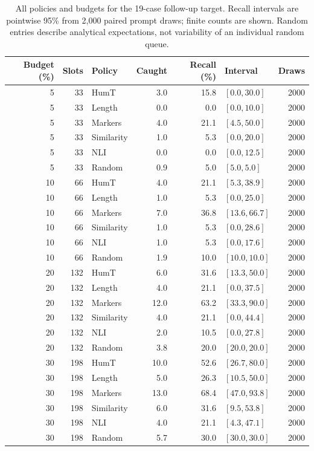 \begin{table}[p]
\centering\footnotesize
\caption{All policies and budgets for the 19-case follow-up target. Recall intervals are pointwise 95\% from 2,000 paired prompt draws; finite counts are shown. Random entries describe analytical expectations, not variability of an individual random queue.}
\label{tab:followup_budgets_all}
\begin{tabular}{rrlrrlr}
\toprule
Budget (\%) & Slots & Policy & Caught & Recall (\%) & Interval & Draws \\
\midrule
5 & 33 & HumT & 3.0 & 15.8 & $[0.0, 30.0]$ & 2000 \\
5 & 33 & Length & 0.0 & 0.0 & $[0.0, 10.0]$ & 2000 \\
5 & 33 & Markers & 4.0 & 21.1 & $[4.5, 50.0]$ & 2000 \\
5 & 33 & Similarity & 1.0 & 5.3 & $[0.0, 20.0]$ & 2000 \\
5 & 33 & NLI & 0.0 & 0.0 & $[0.0, 12.5]$ & 2000 \\
5 & 33 & Random & 0.9 & 5.0 & $[5.0, 5.0]$ & 2000 \\
10 & 66 & HumT & 4.0 & 21.1 & $[5.3, 38.9]$ & 2000 \\
10 & 66 & Length & 1.0 & 5.3 & $[0.0, 25.0]$ & 2000 \\
10 & 66 & Markers & 7.0 & 36.8 & $[13.6, 66.7]$ & 2000 \\
10 & 66 & Similarity & 1.0 & 5.3 & $[0.0, 28.6]$ & 2000 \\
10 & 66 & NLI & 1.0 & 5.3 & $[0.0, 17.6]$ & 2000 \\
10 & 66 & Random & 1.9 & 10.0 & $[10.0, 10.0]$ & 2000 \\
20 & 132 & HumT & 6.0 & 31.6 & $[13.3, 50.0]$ & 2000 \\
20 & 132 & Length & 4.0 & 21.1 & $[0.0, 37.5]$ & 2000 \\
20 & 132 & Markers & 12.0 & 63.2 & $[33.3, 90.0]$ & 2000 \\
20 & 132 & Similarity & 4.0 & 21.1 & $[0.0, 44.4]$ & 2000 \\
20 & 132 & NLI & 2.0 & 10.5 & $[0.0, 27.8]$ & 2000 \\
20 & 132 & Random & 3.8 & 20.0 & $[20.0, 20.0]$ & 2000 \\
30 & 198 & HumT & 10.0 & 52.6 & $[26.7, 80.0]$ & 2000 \\
30 & 198 & Length & 5.0 & 26.3 & $[10.5, 50.0]$ & 2000 \\
30 & 198 & Markers & 13.0 & 68.4 & $[47.0, 93.8]$ & 2000 \\
30 & 198 & Similarity & 6.0 & 31.6 & $[9.5, 53.8]$ & 2000 \\
30 & 198 & NLI & 4.0 & 21.1 & $[4.3, 47.1]$ & 2000 \\
30 & 198 & Random & 5.7 & 30.0 & $[30.0, 30.0]$ & 2000 \\
\bottomrule
\end{tabular}
\end{table}
